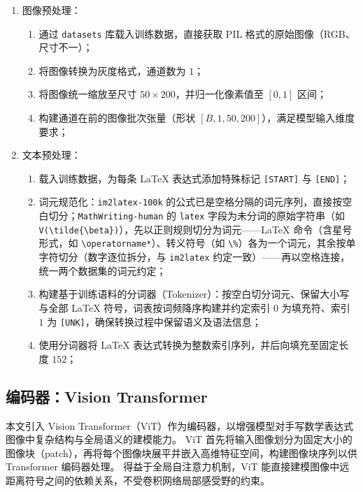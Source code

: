 \begin{enumerate}[label={（\arabic*）}, leftmargin=2em, labelsep=0.5em, itemsep=0pt]
\item 图像预处理：
\begin{enumerate}[label={（\alph*）}, leftmargin=2em, labelsep=0.5em, itemsep=0pt]
\item 通过 \texttt{datasets} 库载入训练数据，直接获取 PIL 格式的原始图像（RGB、尺寸不一）；
\item 将图像转换为灰度格式，通道数为 $1$；
\item 将图像统一缩放至尺寸 $50 \times 200$，并归一化像素值至 $[0,1]$ 区间；
\item 构建通道在前的图像批次张量（形状 $[B, 1, 50, 200]$），满足模型输入维度要求；
\end{enumerate}
\item 文本预处理：
\begin{enumerate}[label={（\alph*）}, leftmargin=2em, labelsep=0.5em, itemsep=0pt]
\item 载入训练数据，为每条 LaTeX 表达式添加特殊标记 \texttt{[START]} 与 \texttt{[END]}；
\item 词元规范化：\texttt{im2latex-100k} 的公式已是空格分隔的词元序列，直接按空白切分；\texttt{MathWriting-human} 的 \texttt{latex} 字段为未分词的原始字符串（如 \texttt{V(\textbackslash tilde\{\textbackslash beta\})}），先以正则规则切分为词元——LaTeX 命令（含星号形式，如 \texttt{\textbackslash operatorname*}）、转义符号（如 \texttt{\textbackslash\%}）各为一个词元，其余按单字符切分（数字逐位拆分，与 \texttt{im2latex} 约定一致）——再以空格连接，统一两个数据集的词元约定；
\item 构建基于训练语料的分词器（Tokenizer）：按空白切分词元、保留大小写与全部 LaTeX 符号，词表按词频降序构建并约定索引 $0$ 为填充符、索引 $1$ 为 \texttt{[UNK]}，确保转换过程中保留语义及语法信息；
\item 使用分词器将 LaTeX 表达式转换为整数索引序列，并后向填充至固定长度 $152$；
\end{enumerate}
\end{enumerate}
\subsection{编码器：Vision Transformer}
本文引入 Vision Transformer（ViT）作为编码器，以增强模型对手写数学表达式图像中复杂结构与全局语义的建模能力。
ViT 首先将输入图像划分为固定大小的图像块（patch），再将每个图像块展平并嵌入高维特征空间，构建图像块序列以供 Transformer 编码器处理。
得益于全局自注意力机制，ViT 能直接建模图像中远距离符号之间的依赖关系，不受卷积网络局部感受野的约束。

